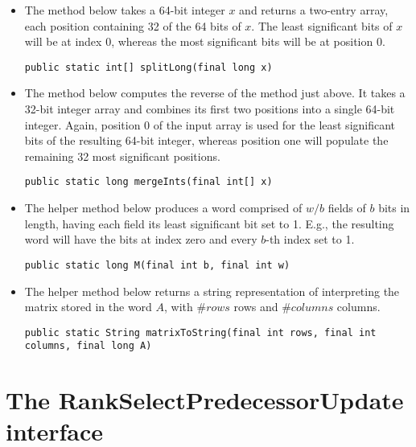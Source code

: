 \begin{itemize}
    \item
    The method below takes a 64-bit integer $x$ and returns a two-entry array, each position containing 32 of the 64 bits of $x$. The least significant bits of $x$ will be at index 0, whereas the most significant bits will be at position 0.
    \begin{lstlisting}
public static int[] splitLong(final long x)
    \end{lstlisting}
    
    \item
    The method below computes the reverse of the method just above. It takes a 32-bit integer array and combines its first two positions into a single 64-bit integer. Again, position 0 of the input array is used for the least significant bits of the resulting 64-bit integer, whereas position one will populate the remaining 32 most significant positions.
    \begin{lstlisting}
public static long mergeInts(final int[] x)
    \end{lstlisting}
    
    \item
    The helper method below produces a word comprised of $w / b$ fields of $b$ bits in length, having each field its least significant bit set to 1. E.g., the resulting word will have the bits at index zero and every $b$-th index set to 1.
    \begin{lstlisting}
public static long M(final int b, final int w)
    \end{lstlisting}

    \item
    The helper method below returns a string representation of interpreting the matrix stored in the word $A$, with $\#rows$ rows and $\#columns$ columns.
    \begin{lstlisting}
public static String matrixToString(final int rows, final int columns, final long A)
    \end{lstlisting}
\end{itemize}

\section{The {\ttfamily RankSelectPredecessorUpdate} interface}

